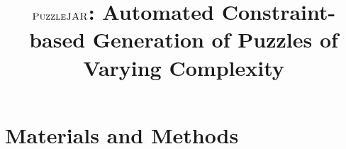 \documentclass[12pt]{article}
\begin{document}
\doublespacing


\title{$\textsc{PuzzleJAR}$: Automated Constraint-based Generation of Puzzles of Varying Complexity}

\maketitle




\section{Materials and Methods}







\newpage


\end{document}
